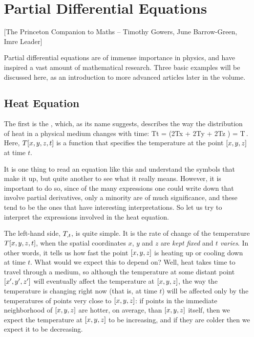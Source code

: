 \section{Partial Differential Equations}

[The Princeton Companion to Maths -- Timothy Gowers, June Barrow-Green, Imre Leader]

Partial differential equations are of immense importance in physics, and have inspired a vast amount of mathematical research. Three basic examples will be discussed here, as an introduction to more advanced articles later in the volume.


\subsection{Heat Equation}
The first is the , which, as its name suggests, describes the way the distribution of heat in a physical medium changes with time:
\beq
\xpd Tt = \kappa\left(\nxpd 2Tx + \nxpd 2Ty + \nxpd 2Tz \right) = \kappa\lder T\,.
\eeq
Here, $T\!\left[{x,y,z,t}\right]$ is a function that specifies the temperature at the point $\left[{x,y,z}\right]$ at time $t$.

It is one thing to read an equation like this and understand the symbols that make it up, but quite another to see what it really means. However, it is important to do so, since of the many expressions one could write down that involve partial derivatives, only a minority are of much significance, and these tend to be the ones that have interesting interpretations. So let us try to interpret the expressions involved in the heat equation.

The left-hand side, ${T}_{,{t}}$, is quite simple. It is the rate of change of the temperature $T\!\left[{x,y,z,t}\right]$, when the spatial coordinates $x$, $y$ and $z$ are \emph{kept fixed} and $t$ \emph{varies}. In other words, it tells us how fast the point $\left[{x,y,z}\right]$ is heating up or cooling down at time $t$. What would we expect this to depend on? Well, heat takes time to travel through a medium, so although the temperature at some distant point $\left[{x',y',z'}\right]$ will eventually affect the temperature at $\left[{x,y,z}\right]$, the way the temperature is changing right now (that is, at time $t$) will be affected only by the temperatures of points very close to $\left[{x,y,z}\right]$: if points in the immediate neighborhood of $\left[{x,y,z}\right]$ are hotter, on average, than $\left[{x,y,z}\right]$ itself, then we expect the temperature at $\left[{x,y,z}\right]$ to be increasing, and if they are colder then we expect it to be decreasing.

